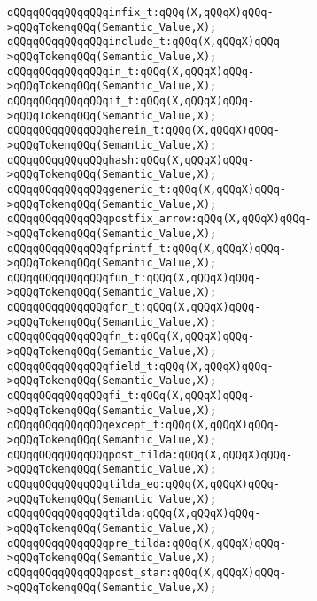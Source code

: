 \verb|qQQqqQQqqQQqqQQqinfix_t:qQQq(X,qQQqX)qQQq->qQQqTokenqQQq(Semantic_Value,X);|\newline
\verb|qQQqqQQqqQQqqQQqinclude_t:qQQq(X,qQQqX)qQQq->qQQqTokenqQQq(Semantic_Value,X);|\newline
\verb|qQQqqQQqqQQqqQQqin_t:qQQq(X,qQQqX)qQQq->qQQqTokenqQQq(Semantic_Value,X);|\newline
\verb|qQQqqQQqqQQqqQQqif_t:qQQq(X,qQQqX)qQQq->qQQqTokenqQQq(Semantic_Value,X);|\newline
\verb|qQQqqQQqqQQqqQQqherein_t:qQQq(X,qQQqX)qQQq->qQQqTokenqQQq(Semantic_Value,X);|\newline
\verb|qQQqqQQqqQQqqQQqhash:qQQq(X,qQQqX)qQQq->qQQqTokenqQQq(Semantic_Value,X);|\newline
\verb|qQQqqQQqqQQqqQQqgeneric_t:qQQq(X,qQQqX)qQQq->qQQqTokenqQQq(Semantic_Value,X);|\newline
\verb|qQQqqQQqqQQqqQQqpostfix_arrow:qQQq(X,qQQqX)qQQq->qQQqTokenqQQq(Semantic_Value,X);|\newline
\verb|qQQqqQQqqQQqqQQqfprintf_t:qQQq(X,qQQqX)qQQq->qQQqTokenqQQq(Semantic_Value,X);|\newline
\verb|qQQqqQQqqQQqqQQqfun_t:qQQq(X,qQQqX)qQQq->qQQqTokenqQQq(Semantic_Value,X);|\newline
\verb|qQQqqQQqqQQqqQQqfor_t:qQQq(X,qQQqX)qQQq->qQQqTokenqQQq(Semantic_Value,X);|\newline
\verb|qQQqqQQqqQQqqQQqfn_t:qQQq(X,qQQqX)qQQq->qQQqTokenqQQq(Semantic_Value,X);|\newline
\verb|qQQqqQQqqQQqqQQqfield_t:qQQq(X,qQQqX)qQQq->qQQqTokenqQQq(Semantic_Value,X);|\newline
\verb|qQQqqQQqqQQqqQQqfi_t:qQQq(X,qQQqX)qQQq->qQQqTokenqQQq(Semantic_Value,X);|\newline
\verb|qQQqqQQqqQQqqQQqexcept_t:qQQq(X,qQQqX)qQQq->qQQqTokenqQQq(Semantic_Value,X);|\newline
\verb|qQQqqQQqqQQqqQQqpost_tilda:qQQq(X,qQQqX)qQQq->qQQqTokenqQQq(Semantic_Value,X);|\newline
\verb|qQQqqQQqqQQqqQQqtilda_eq:qQQq(X,qQQqX)qQQq->qQQqTokenqQQq(Semantic_Value,X);|\newline
\verb|qQQqqQQqqQQqqQQqtilda:qQQq(X,qQQqX)qQQq->qQQqTokenqQQq(Semantic_Value,X);|\newline
\verb|qQQqqQQqqQQqqQQqpre_tilda:qQQq(X,qQQqX)qQQq->qQQqTokenqQQq(Semantic_Value,X);|\newline
\verb|qQQqqQQqqQQqqQQqpost_star:qQQq(X,qQQqX)qQQq->qQQqTokenqQQq(Semantic_Value,X);|\newline
